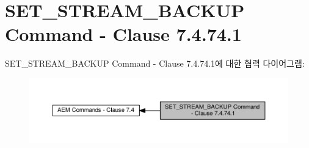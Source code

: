 \hypertarget{group__command__set__stream__backup}{}\section{S\+E\+T\+\_\+\+S\+T\+R\+E\+A\+M\+\_\+\+B\+A\+C\+K\+UP Command -\/ Clause 7.4.74.1}
\label{group__command__set__stream__backup}
S\+E\+T\+\_\+\+S\+T\+R\+E\+A\+M\+\_\+\+B\+A\+C\+K\+UP Command -\/ Clause 7.4.74.1에 대한 협력 다이어그램\+:
\nopagebreak
\begin{figure}[H]
\begin{center}
\leavevmode
\includegraphics[width=350pt]{group__command__set__stream__backup}
\end{center}
\end{figure}
